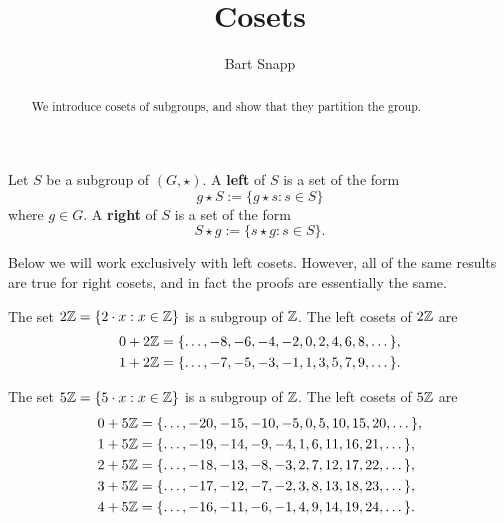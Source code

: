 \documentclass{ximera}
\author{Bart Snapp}
\title{Cosets}
\begin{document}
\begin{abstract}
We introduce cosets of subgroups, and show that they partition the
group.
\end{abstract}
\maketitle


\begin{definition}
  Let $S$ be a subgroup of $(G,\star)$. A \textbf{left } of $S$ is a set of
  the form
  \[
  g\star S := \{g\star s : s\in S\}
  \]
  where $g\in G$. A \textbf{right } of $S$ is a set of the form
  \[
  S\star g := \{s\star g : s\in S\}.
  \]
\end{definition}

\begin{remark}
  Below we will work exclusively with left cosets. However, all of the
  same results are true for right cosets, and in fact the proofs are
  essentially the same.
\end{remark}



\begin{example}
  The set $2\mathbb Z = \{2\cdot x: x\in \mathbb Z\}$ is a subgroup of $\mathbb Z$. The
  left cosets of $2\mathbb Z$ are
  \begin{align*}
    0+2\mathbb Z &= \{\dots, -8,-6,-4,-2,0,2,4,6,8,\dots\},\\
    1+2\mathbb Z &= \{\dots, -7,-5,-3,-1,1,3,5,7,9,\dots\}.
  \end{align*}
\end{example}


\begin{example}
  The set $5\mathbb Z = \{5\cdot x: x\in \mathbb Z\}$ is a subgroup of $\mathbb Z$. The
  left cosets of $5\mathbb Z$ are
  \begin{align*}
    0+5\mathbb Z &= \{\dots, -20,-15,-10,-5,0,5,10,15,20,\dots\},\\
    1+5\mathbb Z &= \{\dots, -19,-14,-9 ,-4,1,6,11,16,21,\dots\},\\
    2+5\mathbb Z &= \{\dots, -18,-13,-8 ,-3,2,7,12,17,22,\dots\},\\
    3+5\mathbb Z &= \{\dots, -17,-12,-7 ,-2,3,8,13,18,23,\dots\},\\
    4+5\mathbb Z &= \{\dots, -16,-11,-6 ,-1,4,9,14,19,24,\dots\}.
  \end{align*}
\end{example}
\end{document}

